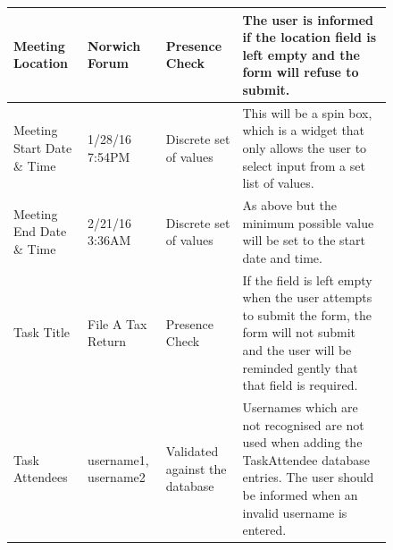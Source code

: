 \begin{figure}
\begin{table}[]
\begin{tabular}{llll}
\multicolumn{1}{|l|}{Meeting Location}           & \multicolumn{1}{l|}{Norwich Forum}                                    & \multicolumn{1}{l|}{Presence Check}                                          & \multicolumn{1}{l|}{The user is informed if the location field is left empty and the form will refuse to submit.}                                                                                                                                                                                                \\ \hline
\multicolumn{1}{|l|}{Meeting Start Date \& Time} & \multicolumn{1}{l|}{1/28/16 7:54PM}                                   & \multicolumn{1}{l|}{Discrete set of values}                                  & \multicolumn{1}{l|}{This will be a spin box, which is a widget that only allows the user to select input from a set list of values.}                                                                                                                                                                             \\ \hline
\multicolumn{1}{|l|}{Meeting End Date \& Time}   & \multicolumn{1}{l|}{2/21/16 3:36AM}                                   & \multicolumn{1}{l|}{Discrete set of values}                                  & \multicolumn{1}{l|}{As above but the minimum possible value will be set to the start date and time.}                                                                                                                                                                                                             \\ \hline
\multicolumn{1}{|l|}{Task Title}                 & \multicolumn{1}{l|}{File A Tax Return}                                & \multicolumn{1}{l|}{Presence Check}                                          & \multicolumn{1}{l|}{If the field is left empty when the user attempts to submit the form, the form will not submit and the user will be reminded gently that that field is required.}                                                                                                                            \\ \hline
\multicolumn{1}{|l|}{Task Attendees}             & \multicolumn{1}{l|}{username1, username2}                             & \multicolumn{1}{l|}{Validated against the database}                          & \multicolumn{1}{l|}{Usernames which are not recognised are not used when adding the TaskAttendee database entries. The user should be informed when an invalid username is entered.}                                                                                                                             \\ \hline

\end{tabular}
\end{table}
\end{figure}

